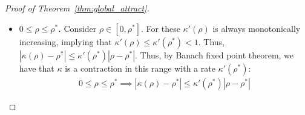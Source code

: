 \documentclass[twoside]{article}
\theoremstyle{definition}
\begin{document}
\begin{proof}[Proof of Theorem~\ref{thm:global_attract}]
\begin{itemize}

\item \textbf{$0\le \rho \le \rho^*$.}
Consider $\rho \in [0,\rho^*]$. For these $\kappa'(\rho)$ is always monotonically increasing, implying that $\kappa'(\rho)\le \kappa'(\rho^*) < 1$. Thus, $|\kappa(\rho)-\rho^*| \le \kappa'(\rho^*) |\rho - \rho^*|$. Thus, by Banach fixed point theorem, we have that $\kappa$ is a contraction in this range with a rate $\kappa'(\rho^*)$:
\begin{align*}
0\le \rho \le \rho^* \implies |\kappa(\rho) - \rho^*| \le \kappa'(\rho^*) |\rho-\rho^*|
\end{align*}


\end{itemize}
\end{proof}
\end{document}
